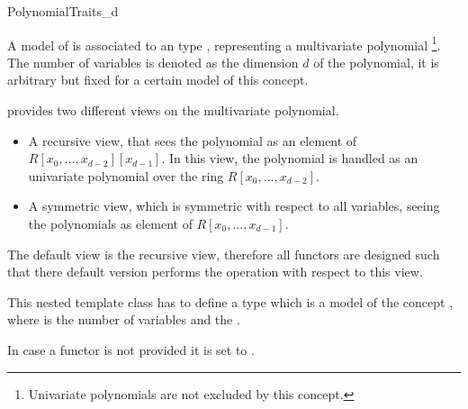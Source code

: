\begin{ccRefConcept}{PolynomialTraits_d}

\ccDefinition
A model of  is associated to an type 
, representing a multivariate polynomial
\footnote{Univariate polynomials are not excluded by this concept.}. 
The number of variables is denoted as the dimension $d$ of the polynomial,
it is arbitrary but fixed for a certain model of this concept.  

 provides two different views on the 
multivariate polynomial. 

\begin{itemize}
\item A recursive view, that sees the polynomial as an element of 
$R[x_0,\dots,x_{d-2}][x_{d-1}]$. In this view, the polynomial is handled as
an univariate polynomial over the ring $R[x_0,\dots,x_{d-2}]$. 
\item A symmetric view, which is symmetric with respect to all variables,
seeing the polynomials as element of $R[x_0,\dots,x_{d-1}]$.
\end{itemize}


The default view is the recursive view, therefore all functors are 
designed such that there default version performs the operation 
with respect to this view. 

\ccRefines

\ccConstants
 

\ccTypes

\ccGlue
{}\ccGlue
{}

{This nested template class has to define a type  which is a model 
of the concept , where  is the number of variables 
and  the .}


In case a functor is not provided it is set to .


\end{ccRefConcept}
